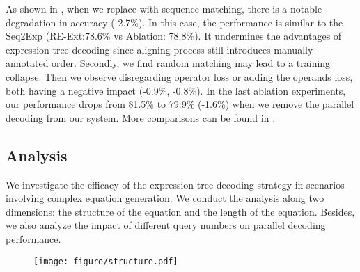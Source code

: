 \documentclass[11pt]{article}
\begin{document}
As shown in , when we replace with sequence matching, there is a notable degradation in accuracy (-2.7\%). In this case, the performance is similar to the Seq2Exp (RE-Ext:78.6\% vs Ablation: 78.8\%). It undermines the advantages of expression tree decoding since aligning process still introduces manually-annotated order. Secondly, we find random matching may lead to a training collapse. Then we observe disregarding  operator loss or adding the  operands loss, both having a negative impact (-0.9\%, -0.8\%). In the last ablation experiments, our performance drops from 81.5\% to 79.9\% (-1.6\%) when we remove the parallel decoding from our system. More comparisons can be found in .

\subsection{Analysis}
We investigate the efficacy of the expression tree decoding strategy in scenarios involving complex equation generation. We conduct the analysis along two dimensions: the structure of the equation and the length of the equation. Besides, we also analyze the impact of different query numbers on parallel decoding performance.


\begin{figure}[t] \centering \texttt{[image: figure/structure.pdf]} \label{Fig.structure} \vspace{-20pt} \end{figure}
\end{document}
